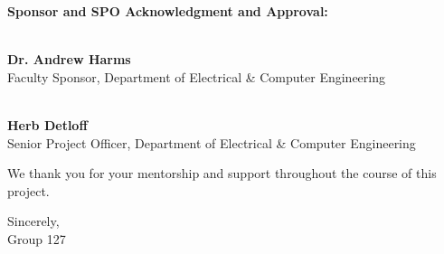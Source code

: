 \documentclass[11pt]{letter}
\begin{document}
\vspace{0.5em}

\noindent\textbf{Sponsor and SPO Acknowledgment and Approval:}

\vspace{1.5em}

\noindent\makebox[2.5in]{\hrulefill} \\
\textbf{Dr. Andrew Harms} \\
Faculty Sponsor, Department of Electrical \& Computer Engineering

\vspace{1.5em}

\noindent\makebox[2.5in]{\hrulefill} \\
\textbf{Herb Detloff} \\
Senior Project Officer, Department of Electrical \& Computer Engineering \\
\vspace{0.5em}

\noindent We thank you for your mentorship and support throughout the course of this project.

\vspace{0.5em}

\noindent Sincerely, \\
Group 127
\end{document}
